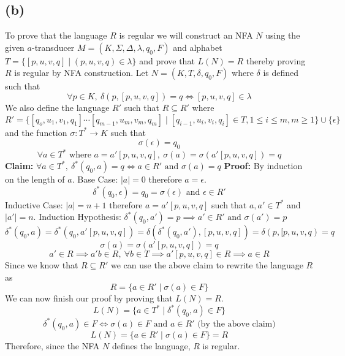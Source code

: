 \documentclass[12pt]{article}
\begin{document}
\subsection*{(b)}
To prove that the language $R$ is regular we will construct an NFA $N$ using
the given $a$-transducer $M = (K, \Sigma, \Delta, \lambda, q_0, F)$ and alphabet
$T = \{[p,u,v,q] \mid (p,u,v,q) \in \lambda\}$ and prove that $L(N) = R$ thereby
proving $R$ is regular by NFA construction. Let $N = (K, T, \delta, q_0, F)$
where $\delta$ is defined such that
$$\forall p \in K,\ \delta(p, [p,u,v,q]) = q \iff [p,u,v,q] \in \lambda$$
We also define the language $R'$ such that $R \subseteq R'$ where
$$R' = \{[q_o, u_1,v_1,q_1] \cdots [q_{m-1},u_m,v_m,q_m] \mid
[q_{i-1},u_i,v_i,q_i] \in T, 1 \le i \le m, m \ge 1\} \cup \{\epsilon\}$$
and the function $\sigma : T^* \rightarrow K$ such that
$$\sigma(\epsilon) = q_0$$
$$\forall a \in T^* \text{ where }
a = a'[p,u,v,q],\ \sigma(a) = \sigma(a'[p,u,v,q]) = q$$
\textbf{Claim: } $\forall a \in T^*,\ \delta^*(q_0, a) = q \iff a \in R'
\text{ and } \sigma(a) = q$
\newline
\textbf{Proof: } By induction on the length of $a$.
\newline
Base Case: $|a| = 0$ therefore $a = \epsilon$.
$$\delta^*(q_0, \epsilon) = q_0 = \sigma(\epsilon) \text{ and }\epsilon \in R'$$
Inductive Case: $|a| = n+1$ therefore $a = a'[p,u,v,q]$ such that $a,a' \in T^*$
and $|a'| = n$.
Induction Hypothesis: $\delta^*(q_0, a') = p \implies a' \in R' \text{ and }
\sigma(a') = p$
$$ \delta^*(q_0, a) = \delta^*(q_0, a'[p,u,v,q]) =
\delta(\delta^*(q_0, a') ,[p,u,v,q]) = \delta(p, [p,u,v,q) = q$$
$$\sigma(a) = \sigma(a'[p,u,v,q]) = q$$
$$a' \in R \implies a'b \in R,\ \forall b \in T \implies a'[p,u,v,q] \in R
\implies a \in R$$
Since we know that $R \subseteq R'$ we can use the above claim to rewrite the
language $R$ as $$R = \{a \in R' \mid \sigma(a) \in F\}$$
We can now finish our proof by proving that $L(N) = R$.
$$L(N) = \{a \in T^* \mid \delta^*(q_0, a) \in F\}$$
$$\delta^*(q_0, a) \in F \iff \sigma(a) \in F \text{ and } a \in R'
\text{ (by the above claim)}$$
$$L(N) = \{a \in R' \mid \sigma(a) \in F\} = R$$
Therefore, since the NFA $N$ defines the language, $R$ is regular.
\end{document}
